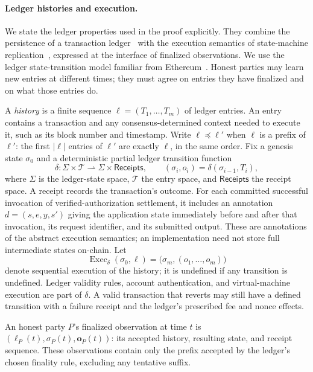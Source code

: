 \documentclass[10pt,letterpaper]{article}
\begin{document}
\paragraph{Ledger histories and execution.}
We state the ledger properties used in the proof explicitly. They combine the persistence of a transaction ledger~\citep{garay2015} with the execution semantics of state-machine replication~\citep{castro1999}, expressed at the interface of finalized observations. We use the ledger state-transition model familiar from Ethereum~\citep{yellowpaper}. Honest parties may learn new entries at different times; they must agree on entries they have finalized and on what those entries do.

A \emph{history} is a finite sequence $\ell=(T_1,\ldots,T_m)$ of ledger entries. An entry contains a transaction and any consensus-determined context needed to execute it, such as its block number and timestamp. Write $\ell\preceq\ell'$ when $\ell$ is a prefix of $\ell'$: the first $|\ell|$ entries of $\ell'$ are exactly $\ell$, in the same order. Fix a genesis state $\sigma_0$ and a deterministic partial ledger transition function
\[
 \delta:\Sigma\times\mathcal T\rightharpoonup\Sigma\times\mathsf{Receipts},
 \qquad (\sigma_i,o_i)=\delta(\sigma_{i-1},T_i),
\]
where $\Sigma$ is the ledger-state space, $\mathcal T$ the entry space, and $\mathsf{Receipts}$ the receipt space. A receipt records the transaction's outcome. For each committed successful invocation of verified-authorization settlement, it includes an annotation $d=(s,e,y,s')$ giving the application state immediately before and after that invocation, its request identifier, and its submitted output. These are annotations of the abstract execution semantics; an implementation need not store full intermediate states on-chain. Let
\[
 \operatorname{Exec}_\delta(\sigma_0,\ell)
   =\bigl(\sigma_m,(o_1,\ldots,o_m)\bigr)
\]
denote sequential execution of the history; it is undefined if any transition is undefined. Ledger validity rules, account authentication, and virtual-machine execution are part of $\delta$. A valid transaction that reverts may still have a defined transition with a failure receipt and the ledger's prescribed fee and nonce effects.

An honest party $P$'s finalized observation at time $t$ is $(\ell_P(t),\sigma_P(t),\mathbf o_P(t))$: its accepted history, resulting state, and receipt sequence. These observations contain only the prefix accepted by the ledger's chosen finality rule, excluding any tentative suffix.
\end{document}
